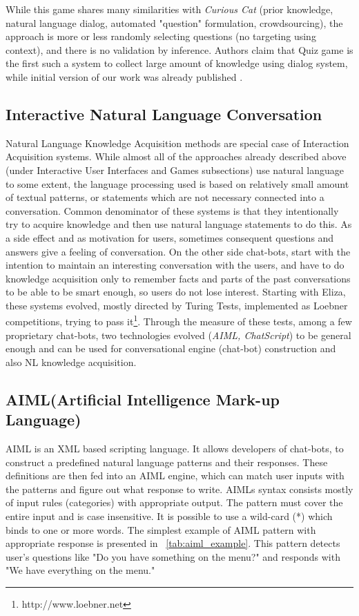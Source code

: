 While this game shares many similarities with \emph{Curious Cat} (prior 
knowledge, natural language dialog, automated "question" formulation,
crowdsourcing), the approach is more or less randomly selecting questions
(no targeting using context),
and there is no validation by inference. Authors claim that Quiz game is the first such a system to collect large amount
of knowledge using dialog system, while initial version of our work was already
published \parencite{Bradesko2016}.

\subsection{Interactive Natural Language Conversation}
\label{section:r:inlc}
Natural Language Knowledge Acquisition methods are special case of Interaction 
Acquisition systems. While almost all of the approaches already described above
(under Interactive User Interfaces and Games subsections) use natural language 
to some extent, the language processing used is based on relatively small amount
of textual patterns, or statements which are not necessary connected into a 
conversation. Common denominator of these systems is that they intentionally try
to acquire knowledge and then use natural language statements to do this. As a 
side effect and as motivation for users, sometimes consequent questions and 
answers give a feeling of conversation. On the other side chat-bots, start with
the intention to maintain an interesting conversation with the users, and have 
to do knowledge acquisition only to remember facts and parts of the past 
conversations to be able to be smart enough, so users do not lose interest.
Starting with Eliza\parencite{Weizenbaum1966}, these systems evolved, mostly 
directed by Turing Tests, implemented as Loebner 
competitions, trying to pass it\footnote{http://www.loebner.net}. Through the 
measure of these tests\parencite{Bradesko2012}, among a few proprietary 
chat-bots, two technologies evolved (\emph{AIML, ChatScript}) to be general 
enough and can be used for conversational engine (chat-bot) construction and 
also NL knowledge acquisition.

\subsection{AIML(Artificial Intelligence Mark-up Language)}
\label{section:r:aiml}
AIML is an XML based 
scripting language. It allows developers of chat-bots, to construct a predefined
natural language patterns and their responses. These definitions are 
then fed into an AIML engine, which can match user inputs with the patterns and 
figure out what response to write. AIMLs syntax consists mostly of input rules 
(categories) with appropriate output. The pattern must cover the entire input 
and is case insensitive. It is possible to use a wild-card (*) which binds to 
one or more words. The simplest example of AIML pattern with appropriate 
response is presented in \tablename~\ref{tab:aiml_example}. This pattern 
detects user's questions like "Do you have something on the menu?" and responds 
with "We have everything on the menu."

